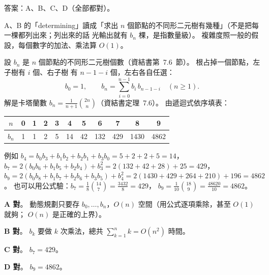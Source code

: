 \begin{pastsoln}
答案：A、B、C、D（全部都對）。

A、B 的「determining」讀成「求出 $n$ 個節點的不同形二元樹有幾種」（不是把每一棵都列出來；列出來的話
光輸出就有 $b_n$ 棵，是指數量級）。 複雜度照一般的假設，每個數字的加法、乘法算 $O(1)$。

設 $b_n$ 是 $n$ 個節點的不同形二元樹個數（資結書第~7.6~節）。 根占掉一個節點，左子樹有 $i$ 個、右子樹
有 $n - 1 - i$ 個，左右各自任選：
\[
b_0 = 1,\qquad b_n = \sum_{i=0}^{n-1} b_i\, b_{n-1-i}\quad (n \ge 1).
\]
解是卡塔蘭數 $b_n = \frac{1}{n+1}\binom{2n}{n}$（資結書定理~7.6）。 由遞迴式依序填表：
\begin{center}
\small
\begin{tabular}{c|cccccccccc}
$n$ & 0 & 1 & 2 & 3 & 4 & 5 & 6 & 7 & 8 & 9 \\ \hline
$b_n$ & 1 & 1 & 2 & 5 & 14 & 42 & 132 & 429 & 1430 & 4862 \\
\end{tabular}
\end{center}
例如 $b_4 = b_0b_3 + b_1b_2 + b_2b_1 + b_3b_0 = 5 + 2 + 2 + 5 = 14$，
$b_7 = 2(b_0b_6 + b_1b_5 + b_2b_4) + b_3^2 = 2(132 + 42 + 28) + 25 = 429$，
$b_9 = 2(b_0b_8 + b_1b_7 + b_2b_6 + b_3b_5) + b_4^2 = 2(1430 + 429 + 264 + 210) + 196 = 4862$。
也可以用公式驗：$b_7 = \frac{1}{8}\binom{14}{7} = \frac{3432}{8} = 429$，
$b_9 = \frac{1}{10}\binom{18}{9} = \frac{48620}{10} = 4862$。

\textbf{A 對}。 動態規劃只要存 $b_0, \ldots, b_n$，$O(n)$ 空間（用公式逐項乘除，甚至 $O(1)$ 就夠；
$O(n)$ 是正確的上界）。

\textbf{B 對}。 $b_k$ 要做 $k$ 次乘法，總共 $\sum_{k=1}^{n} k = O(n^2)$ 時間。

\textbf{C 對}。 $b_7 = 429$。

\textbf{D 對}。 $b_9 = 4862$。
\end{pastsoln}
